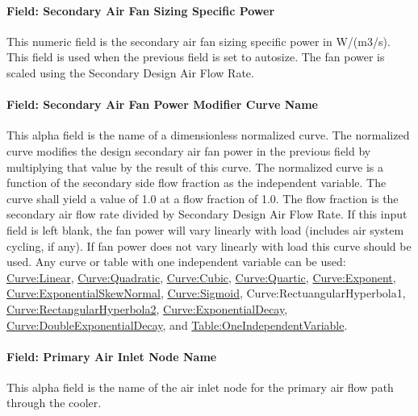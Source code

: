 \paragraph{Field: Secondary Air Fan Sizing Specific Power}\label{field-secondary-air-fan-sizing-specific-power}

This numeric field is the secondary air fan sizing specific power in W/(m3/s). This field is used when the previous field is set to autosize. The fan power is scaled using the Secondary Design Air Flow Rate.

\paragraph{Field: Secondary Air Fan Power Modifier Curve Name}\label{field-secondary-air-fan-power-modifier-curve-name}

This alpha field is the name of a dimensionless normalized curve. The normalized curve modifies the design secondary air fan power in the previous field by multiplying that value by the result of this curve. The normalized curve is a function of the secondary side flow fraction as the independent variable. The curve shall yield a value of 1.0 at a flow fraction of 1.0. The flow fraction is the secondary air flow rate divided by Secondary Design Air Flow Rate. If this input field is left blank, the fan power will vary linearly with load (includes air system cycling, if any). If fan power does not vary linearly with load this curve should be used. Any curve or table with one independent variable can be used: \hyperref[curvelinear]{Curve:Linear}, \hyperref[curvequadratic]{Curve:Quadratic}, \hyperref[curvecubic]{Curve:Cubic}, \hyperref[curvequartic]{Curve:Quartic}, \hyperref[curveexponent]{Curve:Exponent}, \hyperref[curveexponentialskewnormal]{Curve:ExponentialSkewNormal}, \hyperref[curvesigmoid]{Curve:Sigmoid}, Curve:RectuangularHyperbola1, \hyperref[curverectangularhyperbola2]{Curve:RectangularHyperbola2}, \hyperref[curveexponentialdecay]{Curve:ExponentialDecay}, \hyperref[curvedoubleexponentialdecay]{Curve:DoubleExponentialDecay}, and \hyperref[tableoneindependentvariable]{Table:OneIndependentVariable}.

\paragraph{Field: Primary Air Inlet Node Name}\label{field-primary-air-inlet-node-name-2}

This alpha field is the name of the air inlet node for the primary air flow path through the cooler.

